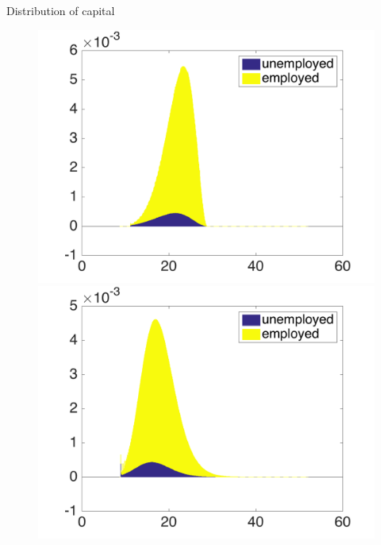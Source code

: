 \documentclass{beamer}
\begin{document}
\begin{frame}{Distribution of capital}
 
\begin{figure}[!tbp]
  \centering
  \begin{minipage}[b]{0.325\textwidth}
    \includegraphics[width=\textwidth]{distribution1}
  \end{minipage}
  \hfill
  \begin{minipage}[b]{0.325\textwidth}
    \includegraphics[width=\textwidth]{distribution2}
  \end{minipage}
  \hfill
  \begin{minipage}[b]{0.325\textwidth}

\end{minipage}
\end{figure}
\end{frame}
\end{document}
